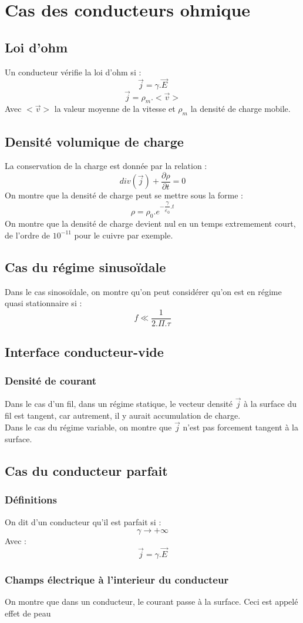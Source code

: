 \section{Cas des conducteurs ohmique}
\subsection{Loi d'ohm}
Un conducteur vérifie la loi d'ohm si :
$$\overrightarrow{j} = \gamma.\overrightarrow{E}$$
$$\overrightarrow{j} = \rho_m.<\overrightarrow{v}>$$
Avec $<\overrightarrow{v}>$ la valeur moyenne de la vitesse et $\rho_m$ la densité de charge mobile.
\subsection{Densité volumique de charge}
La conservation de la charge est donnée par la relation : 
$$div(\overrightarrow{j}) + \dfrac{\partial \rho}{\partial t} = 0$$
On montre que la densité de charge peut se mettre sous la forme : 
$$\rho = \rho_0.e^{-\dfrac{\gamma}{\varepsilon_0}.t}$$
On montre que la densité de charge devient nul en un temps extremement court, de l'ordre de $10^{-11}$ pour le cuivre par exemple.
\subsection{Cas du régime sinusoïdale}
Dans le cas sinosoïdale, on montre qu'on peut considérer qu'on est en régime quasi stationnaire si : 
$$f \ll \dfrac{1}{2.\Pi.\tau}$$
\subsection{Interface conducteur-vide}
\subsubsection{Densité de courant}
Dans le cas d'un fil, dans un régime statique, le vecteur densité $\overrightarrow{j}$ à la surface du fil est tangent, car autrement, il y aurait accumulation de charge.\\
Dans le cas du régime variable, on montre que $\overrightarrow{j}$ n'est pas forcement tangent à la surface.
\subsection{Cas du conducteur parfait}
\subsubsection{Définitions}
On dit d'un conducteur qu'il est parfait si :
$$\gamma \rightarrow + \infty$$
Avec :
$$\overrightarrow{j} = \gamma.\overrightarrow{E}$$
\subsubsection{Champs électrique à l'interieur du conducteur}
On montre que dans un conducteur, le courant passe à la surface. Ceci est appelé effet de peau
